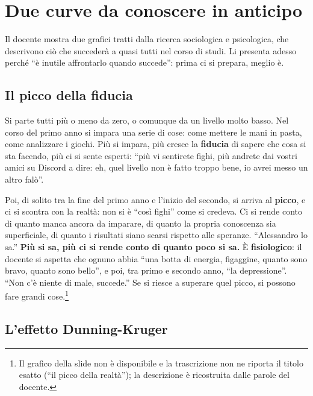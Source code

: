 \section{Due curve da conoscere in anticipo}
\label{gd8:sec:curve}



Il docente mostra due grafici tratti dalla ricerca sociologica e
psicologica, che descrivono ciò che succederà a quasi tutti nel corso di
studi. Li presenta adesso perché ``è inutile affrontarlo quando succede'':
prima ci si prepara, meglio è.

\subsection{Il picco della fiducia}

Si parte tutti più o meno da zero, o comunque da un livello molto basso. Nel
corso del primo anno si impara una serie di cose: come mettere le mani in
pasta, come analizzare i giochi. Più si impara, più cresce la
\textbf{fiducia} di sapere che cosa si sta facendo, più ci si sente esperti:
``più vi sentirete fighi, più andrete dai vostri amici su Discord a dire: eh,
quel livello non è fatto troppo bene, io avrei messo un altro falò''.

Poi, di solito tra la fine del primo anno e l'inizio del secondo, si arriva al
\textbf{picco}, e ci si scontra con la realtà: non si è ``così fighi'' come si
credeva. Ci si rende conto di quanto manca ancora da imparare, di quanto la
propria conoscenza sia superficiale, di quanto i risultati siano scarsi
rispetto alle speranze. ``Alessandro lo sa.'' \textbf{Più si sa, più ci si
rende conto di quanto poco si sa.} È \textbf{fisiologico}: il docente si
aspetta che ognuno abbia ``una botta di energia, figaggine, quanto sono bravo,
quanto sono bello'', e poi, tra primo e secondo anno, ``la depressione''.
``Non c'è niente di male, succede.'' Se si riesce a superare quel picco, si
possono fare grandi cose.\footnote{Il grafico della slide non è disponibile e
la trascrizione non ne riporta il titolo esatto (``il picco della realtà'');
la descrizione è ricostruita dalle parole del docente.}

\subsection{L'effetto Dunning-Kruger}

